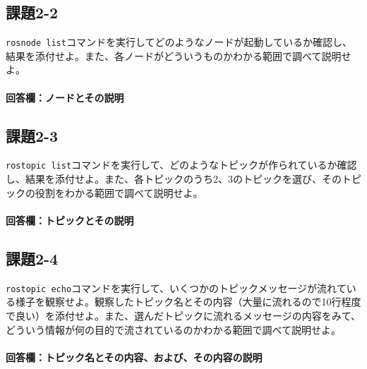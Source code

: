 \documentclass[12pt, xelatex,ja=standard,jafont=hiragino]{bxjsarticle}
\newif\ifdraft
\begin{document}
\subsection{課題2-2}
\begin{screen}
\verb|rosnode list|コマンドを実行してどのようなノードが起動しているか確認し、結果を添付せよ。また、各ノードがどういうものかわかる範囲で調べて説明せよ。
\end{screen}
\paragraph{回答欄：ノードとその説明}
\ifdraft
ノードを貼り付ける。画像でも可。
また、各ノードがどういうものかわかる範囲で調べて説明する。
\fi

\subsection{課題2-3}
\begin{screen}
\verb|rostopic list|コマンドを実行して、どのようなトピックが作られているか確認し、結果を添付せよ。また、各トピックのうち2、3のトピックを選び、そのトピックの役割をわかる範囲で調べて説明せよ。
\end{screen}
\paragraph{回答欄：トピックとその説明}
\ifdraft
トピックのリストを貼り付ける。画像でも可。
各トピックのうち２〜３のトピックを選び、そのトピックの役割をわかる範囲で調べて説明する。
\fi

\subsection{課題2-4}
\begin{screen}
\verb|rostopic echo|コマンドを実行して、いくつかのトピックメッセージが流れている様子を観察せよ。観察したトピック名とその内容（大量に流れるので10行程度で良い）を添付せよ。また、選んだトピックに流れるメッセージの内容をみて、どういう情報が何の目的で流されているのかわかる範囲で調べて説明せよ。
\end{screen}
\paragraph{回答欄：トピック名とその内容、および、その内容の説明}
\ifdraft
トピック名とその内容を貼り付ける(画像でも可)。
選んだトピックに流れるメッセージの内容をみて、どういう情報が何の目的で流されているのかわかる範囲で調べて説明する。
\fi
\end{document}
